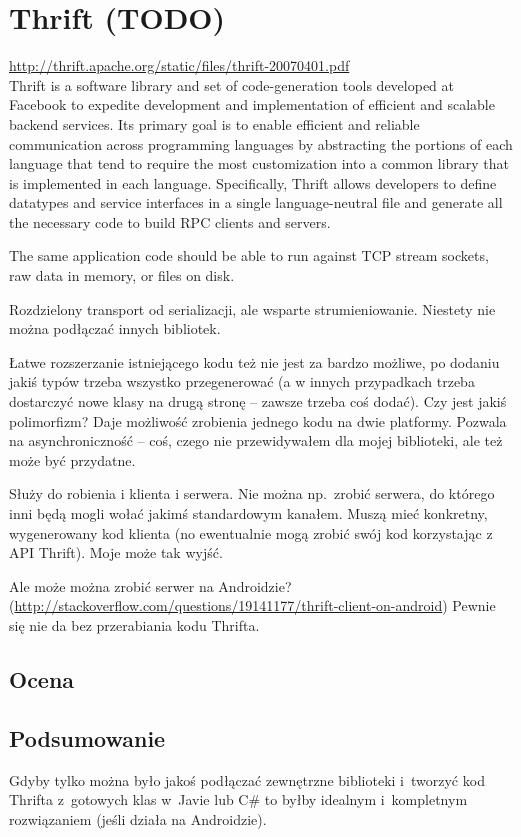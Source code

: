 \section{Thrift (TODO)}
\url{http://thrift.apache.org/static/files/thrift-20070401.pdf}\\

Thrift is a software library and set of code-generation tools developed
at Facebook to expedite development and implementation of
efficient and scalable backend services. Its primary goal is to enable
efficient and reliable communication across programming languages
by abstracting the portions of each language that tend to
require the most customization into a common library that is implemented
in each language. Specifically, Thrift allows developers to
define datatypes and service interfaces in a single language-neutral
file and generate all the necessary code to build RPC clients and
servers.

The same application code should be able to run against TCP stream sockets, raw data in memory, or files on disk.

Rozdzielony transport od serializacji, ale wsparte strumieniowanie.
Niestety nie można podłączać innych bibliotek.

Łatwe rozszerzanie istniejącego kodu też nie jest za bardzo możliwe, po dodaniu jakiś typów trzeba wszystko przegenerować (a w innych przypadkach trzeba dostarczyć nowe klasy na drugą stronę -- zawsze trzeba coś dodać).
Czy jest jakiś polimorfizm?
Daje możliwość zrobienia jednego kodu na dwie platformy.
Pozwala na asynchroniczność -- coś, czego nie przewidywałem dla mojej biblioteki, ale też może być przydatne.

Służy do robienia i klienta i serwera. Nie można np.\ zrobić serwera, do którego inni będą mogli wołać jakimś standardowym kanałem. Muszą mieć konkretny, wygenerowany kod klienta (no ewentualnie mogą zrobić swój kod korzystając z API Thrift). Moje może tak wyjść.

Ale może można zrobić serwer na Androidzie? (\url{http://stackoverflow.com/questions/19141177/thrift-client-on-android}) Pewnie się nie da bez przerabiania kodu Thrifta.

\subsection{Ocena}
\subsection{Podsumowanie}
Gdyby tylko można było jakoś podłączać zewnętrzne biblioteki i~tworzyć kod Thrifta z~gotowych klas w~Javie lub C\# to byłby idealnym i~kompletnym rozwiązaniem (jeśli działa na Androidzie).



